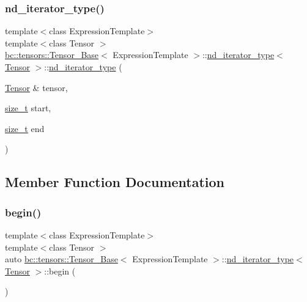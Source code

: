 \subsubsection{\texorpdfstring{nd\+\_\+iterator\+\_\+type()}{nd\_iterator\_type()}\hspace{0.1cm}{\footnotesize\ttfamily [3/3]}}
{\footnotesize\ttfamily template$<$class Expression\+Template$>$ \\
template$<$class Tensor $>$ \\
\hyperlink{classbc_1_1tensors_1_1Tensor__Base}{bc\+::tensors\+::\+Tensor\+\_\+\+Base}$<$ Expression\+Template $>$\+::\hyperlink{structbc_1_1tensors_1_1Tensor__Base_1_1nd__iterator__type}{nd\+\_\+iterator\+\_\+type}$<$ \hyperlink{namespacebc_a659391e47ab612be3ba6c18cf9c89159}{Tensor} $>$\+::\hyperlink{structbc_1_1tensors_1_1Tensor__Base_1_1nd__iterator__type}{nd\+\_\+iterator\+\_\+type} (\begin{DoxyParamCaption}\item[{\hyperlink{namespacebc_a659391e47ab612be3ba6c18cf9c89159}{Tensor} \&}]{tensor,  }\item[{\hyperlink{structbc_1_1tensors_1_1Tensor__Base_1_1nd__iterator__type_a61b9b5bad77746684cc457b24b2cc202}{size\+\_\+t}}]{start,  }\item[{\hyperlink{structbc_1_1tensors_1_1Tensor__Base_1_1nd__iterator__type_a61b9b5bad77746684cc457b24b2cc202}{size\+\_\+t}}]{end }\end{DoxyParamCaption})\hspace{0.3cm}{\ttfamily [inline]}}



\subsection{Member Function Documentation}
\mbox{\label{structbc_1_1tensors_1_1Tensor__Base_1_1nd__iterator__type_a430ba9b782f52539459544676f369e36}} 
\subsubsection{\texorpdfstring{begin()}{begin()}}
{\footnotesize\ttfamily template$<$class Expression\+Template$>$ \\
template$<$class Tensor $>$ \\
auto \hyperlink{classbc_1_1tensors_1_1Tensor__Base}{bc\+::tensors\+::\+Tensor\+\_\+\+Base}$<$ Expression\+Template $>$\+::\hyperlink{structbc_1_1tensors_1_1Tensor__Base_1_1nd__iterator__type}{nd\+\_\+iterator\+\_\+type}$<$ \hyperlink{namespacebc_a659391e47ab612be3ba6c18cf9c89159}{Tensor} $>$\+::begin (\begin{DoxyParamCaption}{ }\end{DoxyParamCaption})\hspace{0.3cm}{\ttfamily [inline]}}

